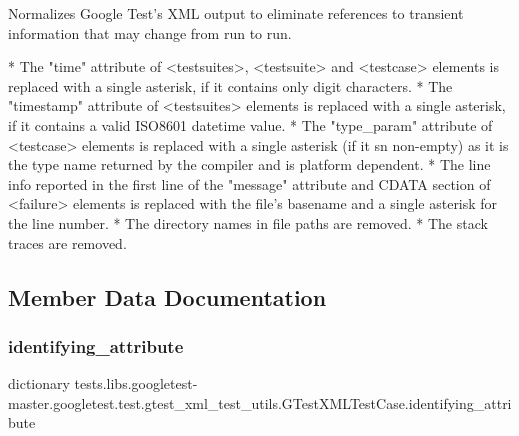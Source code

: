 \begin{DoxyVerb}Normalizes Google Test's XML output to eliminate references to transient
information that may change from run to run.

*  The "time" attribute of <testsuites>, <testsuite> and <testcase>
   elements is replaced with a single asterisk, if it contains
   only digit characters.
*  The "timestamp" attribute of <testsuites> elements is replaced with a
   single asterisk, if it contains a valid ISO8601 datetime value.
*  The "type_param" attribute of <testcase> elements is replaced with a
   single asterisk (if it sn non-empty) as it is the type name returned
   by the compiler and is platform dependent.
*  The line info reported in the first line of the "message"
   attribute and CDATA section of <failure> elements is replaced with the
   file's basename and a single asterisk for the line number.
*  The directory names in file paths are removed.
*  The stack traces are removed.
\end{DoxyVerb}
 

\subsection{Member Data Documentation}
\mbox{\label{classtests_1_1libs_1_1googletest-master_1_1googletest_1_1test_1_1gtest__xml__test__utils_1_1GTestXMLTestCase_a1b4de7a0b64bbf088e0ce134f0bf8167}} 
\subsubsection{\texorpdfstring{identifying\+\_\+attribute}{identifying\_attribute}}
{\footnotesize\ttfamily dictionary tests.\+libs.\+googletest-\/master.\+googletest.\+test.\+gtest\+\_\+xml\+\_\+test\+\_\+utils.\+G\+Test\+X\+M\+L\+Test\+Case.\+identifying\+\_\+attribute\hspace{0.3cm}{\ttfamily [static]}}

